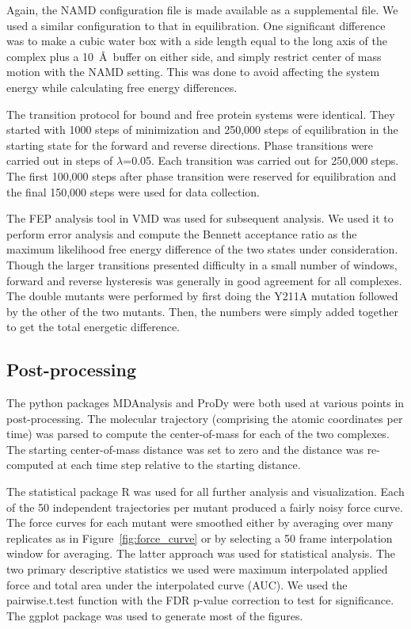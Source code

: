 \documentclass[12pt]{article}
\begin{document}
Again, the NAMD configuration file is made available as a supplemental file. We used a similar configuration to that in equilibration. One significant difference was to make a cubic water box with a side length equal to the long axis of the complex plus a 10~\AA\  buffer on either side, and simply restrict center of mass motion with the NAMD setting. This was done to avoid affecting the system energy while calculating free energy differences. 

The transition protocol for bound and free protein systems were identical. They started with 1000 steps of minimization and 250,000 steps of equilibration in the starting state for the forward and reverse directions. Phase transitions were carried out in steps of $\lambda$=0.05. Each transition was carried out for 250,000 steps. The first 100,000 steps after phase transition were reserved for equilibration and the final 150,000 steps were used for data collection.

The FEP analysis tool in VMD was used for subsequent analysis. We used it to perform error analysis and compute the Bennett acceptance ratio as the maximum likelihood free energy difference of the two states under consideration. Though the larger transitions presented difficulty in a small number of windows, forward and reverse hysteresis was generally in good agreement for all complexes. The double mutants were performed by first doing the Y211A mutation followed by the other of the two mutants. Then, the numbers were simply added together to get the total energetic difference.

\subsection{Post-processing}

The python packages MDAnalysis \citep{Agrawal2011} and ProDy \citep{Bakan2011} were both used at various points in post-processing. The molecular trajectory (comprising the atomic coordinates per time) was parsed to compute the center-of-mass for each of the two complexes. The starting center-of-mass distance was set to zero and the distance was re-computed at each time step relative to the starting distance. 

The statistical package R was used for all further analysis and visualization. Each of the 50 independent trajectories per mutant produced a fairly noisy force curve. The force curves for each mutant were smoothed either by averaging over many replicates as in Figure~\ref{fig:force_curve} or by selecting a 50 frame interpolation window for averaging. The latter approach was used for statistical analysis. The two primary descriptive statistics we used were maximum interpolated applied force and total area under the interpolated curve (AUC). We used the pairwise.t.test function with the FDR p-value correction to test for significance. The ggplot \citep{ggplot} package was used to generate most of the figures. 
\end{document}
